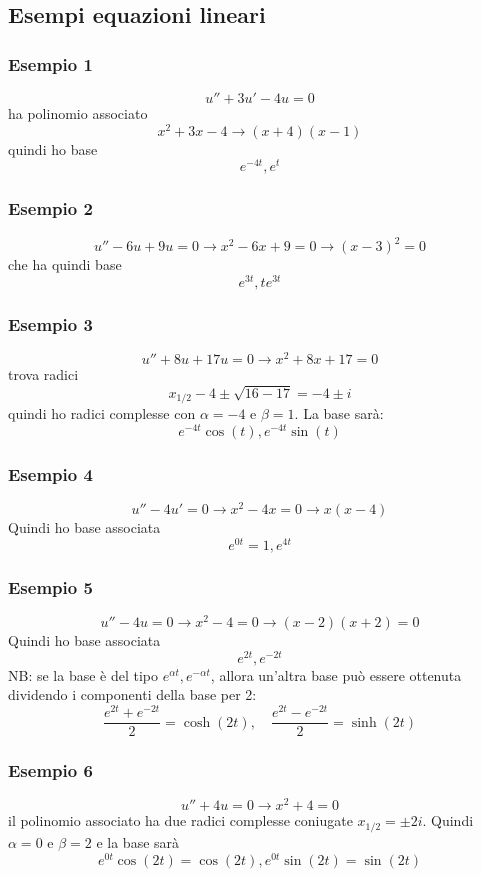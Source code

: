 \subsection*{Esempi equazioni lineari}

\subsubsection*{Esempio 1}
\[
	u'' + 3u' -4u =0
\]
ha polinomio associato
\[
	x^2 + 3x - 4 \rightarrow \left( x+4 \right) \left( x-1 \right)
\]
quindi ho base
\[
	e^{-4t}, e^{t}
\]
\subsubsection*{Esempio 2}
\[
	u'' - 6u + 9u =0 \rightarrow x^2 - 6x + 9 =0 \rightarrow \left( x-3 \right) ^2 =0
\]
che ha quindi base
\[
	e^{3t}, t e ^{3t}
\]
\subsubsection*{Esempio 3}
\[
	u'' + 8u + 17 u =0 \rightarrow x^2 + 8x + 17 =0
\]
trova radici
\[
	x_{1 /2} -4 \pm \sqrt{16-17} = -4 \pm i
\]
quindi ho radici complesse con $ \alpha  = -4 $ e $ \beta  = 1 $. La base sarà:
\[
	e ^{ -4t}\cos \left( t \right) , e ^{ -4t}\sin \left( t \right)
\]
\subsubsection*{Esempio 4}
\[
	u'' - 4u' =0 \rightarrow x^2 - 4x =0 \rightarrow x\left( x-4 \right)
\]
Quindi ho base associata
\[
	e^{0t}=1, e ^{4t}
\]
\subsubsection*{Esempio 5}
\[
	u'' - 4u =0 \rightarrow x^2 - 4	=0 \rightarrow \left( x-2 \right) \left( x+2 \right) =0
\]
Quindi ho base associata
\[
	e^{2t}, e^{-2t}
\]
NB: se la base è del tipo $ e^{\alpha t}, e^{-\alpha t}$, allora un'altra base può essere ottenuta dividendo i componenti della base per 2:
\[
	\frac{e^{2t}+e^{-2t}}{2}=\cosh \left( 2t \right)  , \quad \frac{e^{2t}-e^{-2t}}{2} = \sinh \left( 2t \right)
\]
\subsubsection*{Esempio 6}
\[
	u'' + 4 u =0	\rightarrow x^2 + 4 =0
\]
il polinomio associato ha due radici complesse coniugate $ x_{1 / 2} = \pm 2i$. Quindi $ \alpha  =0 $ e $ \beta  = 2 $ e la base sarà
\[
	e ^{ 0t}\cos \left( 2t \right) = \cos \left( 2t \right) , e^{0t}\sin \left( 2t \right) =\sin \left( 2t \right)
\]
